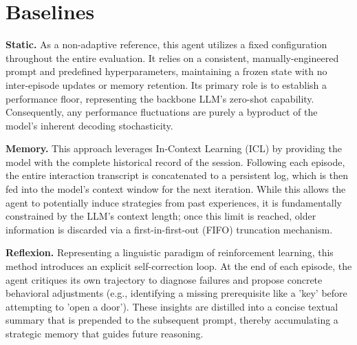 

\section{Baselines}
\label{app:baselines}
\textbf{Static.} As a non-adaptive reference, this agent utilizes a fixed configuration throughout the entire evaluation. It relies on a consistent, manually-engineered prompt and predefined hyperparameters, maintaining a frozen state with no inter-episode updates or memory retention. Its primary role is to establish a performance floor, representing the backbone LLM's zero-shot capability. Consequently, any performance fluctuations are purely a byproduct of the model's inherent decoding stochasticity.

\textbf{Memory.} This approach leverages In-Context Learning (ICL) by providing the model with the complete historical record of the session. Following each episode, the entire interaction transcript is concatenated to a persistent log, which is then fed into the model's context window for the next iteration. While this allows the agent to potentially induce strategies from past experiences, it is fundamentally constrained by the LLM's context length; once this limit is reached, older information is discarded via a first-in-first-out (FIFO) truncation mechanism.

\textbf{Reflexion.} \citep{reflexion} Representing a linguistic paradigm of reinforcement learning, this method introduces an explicit self-correction loop. At the end of each episode, the agent critiques its own trajectory to diagnose failures and propose concrete behavioral adjustments (e.g., identifying a missing prerequisite like a 'key' before attempting to 'open a door'). These insights are distilled into a concise textual summary that is prepended to the subsequent prompt, thereby accumulating a strategic memory that guides future reasoning.


